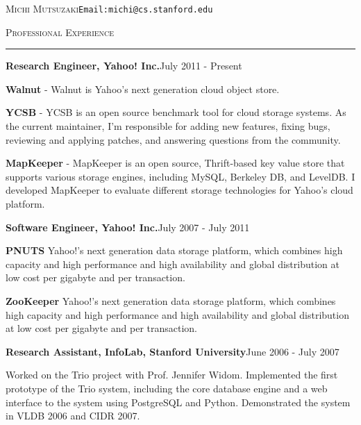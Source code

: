 \documentclass[10pt]{article}
\newcommand{\name}[1]{\begin{center}\Large{\textsc{#1}}\end{center}}
\newcommand{\HRule}{\noindent\rule{\linewidth}{0.1mm}}
\newcommand{\header}[1]{\vspace{0.4cm}\noindent\textsc{\large{#1}}\vspace{-0.2cm}\newline\HRule}
\newcommand{\subheader}[2]{\noindent \textbf{#1}\hspace{\stretch{1}}#2}
\renewcommand{\name}[2]{\noindent \textsc{\LARGE{#1}}\hspace{\stretch{1}}#2\vspace{-0.2cm}}
\begin{document}

\name{Michi Mutsuzaki}{\texttt{Email:michi@cs.stanford.edu}}


\header{Professional Experience}

\subheader{Research Engineer, Yahoo! Inc.}{July 2011 - Present}
\begin{list}{}{\leftmargin=1em}
\item \textbf{Walnut} - Walnut is Yahoo's next generation cloud object store.


\item \textbf{YCSB} - YCSB is an open source benchmark tool for cloud storage
systems. As the current maintainer, I'm responsible for adding new features, 
fixing bugs, reviewing and applying patches, and answering questions from the 
community.

\item \textbf{MapKeeper} - MapKeeper is an open source, Thrift-based key value
store that supports various storage engines, including MySQL, Berkeley DB, and 
LevelDB. I developed MapKeeper to evaluate different storage technologies for
Yahoo's cloud platform.
\end{list}
\vspace{0.2cm}

\subheader{Software Engineer, Yahoo! Inc.}{July 2007 - July 2011}
\begin{list}{}{\leftmargin=1em}
\item \textbf{PNUTS} Yahoo!'s next generation data storage platform,
which combines high capacity and high performance and high 
availability and global distribution at low cost per gigabyte and per transaction. 

\item \textbf{ZooKeeper} Yahoo!'s next generation data storage platform,
which combines high capacity and high performance and high 
availability and global distribution at low cost per gigabyte and per transaction. 
\end{list}

\vspace{0.2cm}

\subheader{Research Assistant, InfoLab, Stanford University}{June 2006 - July 2007}

\noindent
\begin{list}{}{\leftmargin=1em}
\item Worked on the Trio project with Prof. Jennifer Widom. Implemented the
first prototype of the Trio system, including the core database engine and
a web interface to the system using PostgreSQL and Python. Demonstrated the
system in VLDB 2006 and CIDR 2007. 
\end{list}
\end{document}
